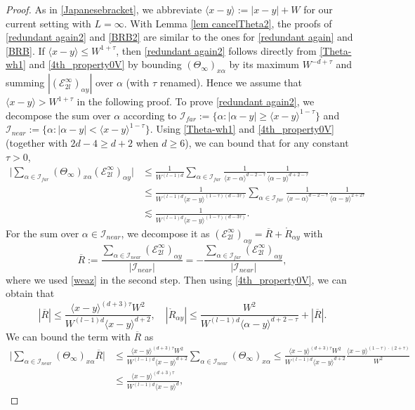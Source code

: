 \documentclass{article}
\newcommand{\1}{\mathds{1}}
\numberwithin{equation}{section}
\newcommand{\al}{\alpha}
\newcommand{\be}{\begin{equation}}
\newcommand{\ee}{\end{equation}}
\renewcommand{\cal}{\mathcal}
\renewcommand{\leq}{\leqslant}
\renewcommand{\geq}{\geqslant}
\renewcommand{\le}{\leq}
\renewcommand{\ge}{\geq}
\theoremstyle{plain} %
\theoremstyle{remark}
\newcommand{\Seleinf}{{\mathcal E}^{\infty}}
\begin{document}
 \begin{proof}
As in \eqref{Japanesebracket}, we abbreviate $\langle x-y\rangle:=|x-y|+W$ for our current setting with $L=\infty$. With Lemma \ref{lem cancelTheta2}, the proofs of \eqref{redundant again2} and \eqref{BRB2} are similar to the ones for \eqref{redundant again} and \eqref{BRB}. If $\langle x-y\rangle\le W^{1+\tau}$, then \eqref{redundant again2} follows directly from \eqref{Theta-wh1} and \eqref{4th_property0V} by bounding $(\Theta_\infty)_{x\al}$ by its maximum $W^{-d+\tau}$ and summing $|(\Seleinf_{2l})_{\al y}|$ over $\al$ (with $\tau$ renamed). Hence we assume that $\langle x-y\rangle> W^{1+\tau}$ in the following proof. To prove \eqref{redundant again2}, we decompose the sum over $\al$ according to $\cal I_{far}:=\{\al: |\al-y|\ge \langle x-y\rangle^{1-\tau}\}$ and $\cal I_{near}:=\{\al: |\al-y|< \langle x-y\rangle^{1-\tau}\}$. Using \eqref{Theta-wh1} and \eqref{4th_property0V} (together with $2d-4\ge d+2$ when $d\ge 6$), we can bound that for any constant $\tau>0$, 
  \begin{align} 
 \Big|\sum_{\al\in \cal I_{far}}(\Theta_\infty)_{x \al} (\Seleinf_{2l})_{\al y} \Big| & \le \frac{1}{W^{(l-1)d}}\sum_{\al\in \cal I_{far}}\frac{1}{  \langle x-\al\rangle^{d-2-\tau} } \frac{1}{ \langle \al -y\rangle^{d+2-\tau} } \nonumber\\
 &\le \frac{1}{W^{(l-1)d}\langle x-y\rangle^{(1-\tau)(d-3\tau)}}\sum_{\al\in \cal I_{far}}\frac{1}{  \langle x-\al\rangle^{d-2-\tau} } \frac{1}{ \langle \al -y\rangle^{2+2 \tau} } \nonumber\\
 & \lesssim \frac{1}{W^{(l-1)d}\langle x-y\rangle^{(1-\tau)(d-3\tau)}}.\label{boundIfar2}
\end{align}
For the sum over $\al\in \cal I_{near}$, we decompose it as $(\Seleinf_{2l})_{\al y}= \overline R + \mathring R_{\al y}$ with
$$ \overline R:= \frac{\sum_{\al\in \cal I_{near}}(\Seleinf_{2l})_{\al y}}{|\cal I_{near}|} = -\frac{\sum_{\al\in \cal I_{far}}(\Seleinf_{2l})_{\al y}}{|\cal I_{near}|},$$
where we used \eqref{weaz} in the second step. Then using \eqref{4th_property0V}, we can obtain that
\be\label{bound barR2} |\overline R| \le  \frac{\langle x-y \rangle^{(d+3)\tau}W^2}{W^{(l-1)d}\langle x-y\rangle^{d+2}} ,\quad | \mathring R_{\al y} | \le  \frac{W^{2}}{W^{(l-1)d}\langle \al-y\rangle^{d+2-\tau}} + |\overline R| .\ee
We can bound the term with $\overline R$ as
\begin{align*}
\Big|\sum_{\al \in \cal I_{near}}(\Theta_\infty)_{x \al} \overline R\Big|  &\le \frac{\langle x-y \rangle^{(d+3)\tau}W^2}{W^{(l-1)d}\langle x-y\rangle^{d+2}} \sum_{\al\in \cal I_{near}}(\Theta_\infty)_{x\al} \le  \frac{\langle x-y \rangle^{(d+3)\tau}W^2}{W^{(l-1)d}\langle x-y\rangle^{d+2}} \frac{\langle x-y\rangle^{(1-\tau)\cdot (2+\tau)}}{W^2} \\ &\le  \frac{\langle x-y \rangle^{(d+3)\tau}}{W^{(l-1)d} \langle x-y\rangle^{d}},

\end{align*}
\end{proof}
\end{document}
